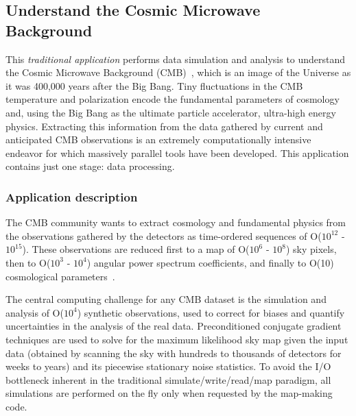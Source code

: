 \subsection{Understand the Cosmic Microwave Background \label{astroJulian}}

%



This {\em traditional application} performs data simulation and analysis to understand the Cosmic Microwave Background (CMB)~\cite{cmb}, which is an image of the Universe as it was 400,000 years after the Big Bang. Tiny fluctuations in the CMB temperature and polarization encode the fundamental parameters of cosmology and, using the Big Bang as the ultimate particle accelerator, ultra-high energy physics. Extracting this information from the data gathered by current and anticipated CMB observations is an extremely computationally intensive endeavor for which massively parallel tools have been developed.  This application contains just one stage: data processing.

\subsubsection*{Application description}


The CMB community wants to extract cosmology and fundamental physics
from the observations gathered by the detectors as time-ordered
sequences of O($10^{12}$ - $10^{15}$). These observations are reduced
first to a map of O($10^6$ - $10^8$) sky pixels, then to O($10^3$ -
$10^4$) angular power spectrum coefficients, and finally to O(10)
cosmological parameters~\cite{cmb2}.

The central computing challenge for any CMB dataset is the simulation and analysis of O($10^4$) synthetic observations, used to correct for biases and quantify uncertainties in the analysis of the real data.
Preconditioned conjugate gradient techniques are used to solve for the maximum likelihood sky map given the input data (obtained by scanning the sky with hundreds to thousands of detectors for weeks to years) and its piecewise stationary noise statistics.
To avoid the I/O bottleneck inherent in the traditional simulate/write/read/map paradigm, all simulations are performed on the fly only when requested by the map-making code.

